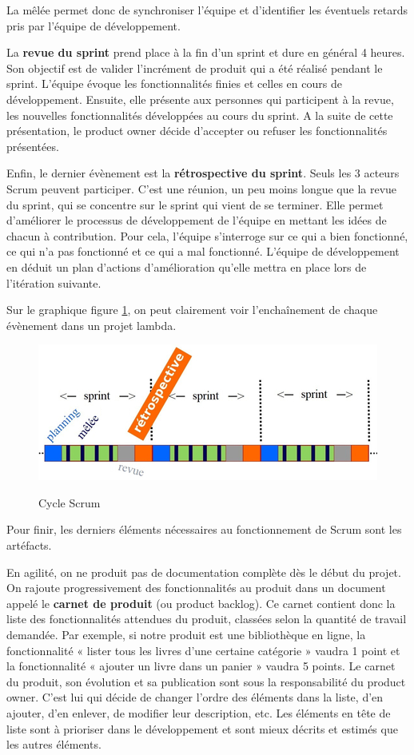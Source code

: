 \documentclass[12pt]{report}
\begin{document}
La mêlée permet donc de synchroniser l'équipe et d'identifier les éventuels retards pris par l'équipe de développement.

La \textbf{revue du sprint} prend place à la fin d'un sprint et dure en général 4 heures. Son objectif est de valider l'incrément de produit qui a été réalisé pendant le sprint.
L'équipe évoque les fonctionnalités finies et celles en cours de développement. Ensuite, elle présente aux personnes qui participent à la revue, les nouvelles fonctionnalités développées au cours du sprint.
A la suite de cette présentation, le product owner décide d'accepter ou refuser les fonctionnalités présentées\cite{wikiscrum}.

Enfin, le dernier évènement est la \textbf{rétrospective du sprint}. Seuls les 3 acteurs Scrum peuvent participer. C'est une réunion, un peu moins longue que la revue du sprint, qui se concentre sur le sprint qui vient de se terminer. Elle permet d'améliorer le processus de développement de l'équipe en mettant les idées de chacun à contribution. Pour cela, l'équipe s'interroge sur ce qui a bien fonctionné, ce qui n'a pas fonctionné et ce qui a mal fonctionné\cite{gitagile}. L'équipe de développement en déduit un plan d'actions d'amélioration qu'elle mettra en place lors de l'itération suivante.

Sur le graphique figure \ref{fig:scrum}, on peut clairement voir l'enchaînement de chaque évènement dans un projet lambda.
\begin{figure}[htp]
  \centering
  \includegraphics[scale=0.8]{images/events_scrum}\cite{agiscrum}
  \caption{Cycle Scrum}
  \label{fig:scrum}
\end{figure}

Pour finir, les derniers éléments nécessaires au fonctionnement de Scrum sont les artéfacts.

En agilité, on ne produit pas de documentation complète dès le début du projet. On rajoute progressivement des fonctionnalités au produit dans un document appelé le \textbf{carnet de produit} (ou product backlog)\cite{wikiscrum}. Ce carnet contient donc la liste des fonctionnalités attendues du produit, classées selon la quantité de travail demandée. Par exemple, si notre produit est une bibliothèque en ligne, la fonctionnalité « lister tous les livres d'une certaine catégorie » vaudra 1 point et la fonctionnalité « ajouter un livre dans un panier » vaudra 5 points. Le carnet du produit, son évolution et sa publication sont sous la responsabilité du product owner. C'est lui qui décide de changer l'ordre des éléments dans la liste, d'en ajouter, d'en enlever, de modifier leur description, etc. Les éléments en tête de liste sont à prioriser dans le développement et sont mieux décrits et estimés que les autres éléments.
\end{document}

